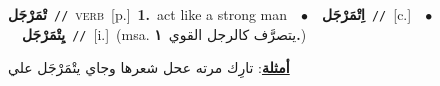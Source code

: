 \documentclass[10pt,a4paper,twoside]{article} %
\begin{document}
\begin{multicols}{2}
{\setlength\topsep{0pt}\textbf{\foreignlanguage{arabic}{تْمَرْجَل}}\ {\color{gray}\texttt{//}\color{black}}\ \textsc{verb}\ [p.]\ \textbf{1.}~act like a strong man\ \ $\bullet$\ \ \setlength\topsep{0pt}\textbf{\foreignlanguage{arabic}{اِتْمَرْجَل}}\ {\color{gray}\texttt{//}\color{black}}\ [c.]\ \ $\bullet$\ \ \setlength\topsep{0pt}\textbf{\foreignlanguage{arabic}{يِتْمَرْجَل}}\ {\color{gray}\texttt{//}\color{black}}\ [i.]\ \color{gray}(msa. \foreignlanguage{arabic}{يتصرَّف كالرجل القوي}~\foreignlanguage{arabic}{\textbf{١.}})\color{black}\  \begin{flushright}\color{gray}\foreignlanguage{arabic}{\textbf{\underline{\foreignlanguage{arabic}{أمثلة}}}: تارِك مرته عحل شعرها وجاي يتْمَرْجَل علي}\end{flushright}\color{black}} \vspace{2mm}


\end{multicols}
\end{document}
